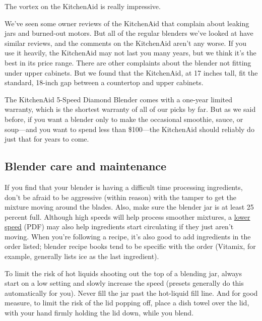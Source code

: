The vortex on the KitchenAid is really impressive.

We've seen some owner reviews of the KitchenAid that complain about
leaking jars and burned-out motors. But all of the regular blenders
we've looked at have similar reviews, and the comments on the KitchenAid
aren't any worse. If you use it heavily, the KitchenAid may not last you
many years, but we think it's the best in its price range. There are
other complaints about the blender not fitting under upper cabinets. But
we found that the KitchenAid, at 17 inches tall, fit the standard,
18-inch gap between a countertop and upper cabinets.

The KitchenAid 5-Speed Diamond Blender comes with a one-year limited
warranty, which is the shortest warranty of all of our picks by far. But
as we said before, if you want a blender only to make the occasional
smoothie, sauce, or soup---and you want to spend less than \$100---the
KitchenAid should reliably do just that for years to come.

\hypertarget{blender-care-and-maintenance}{%
\subsection{Blender care and
maintenance}\label{blender-care-and-maintenance}}

If you find that your blender is having a difficult time processing
ingredients, don't be afraid to be aggressive (within reason) with the
tamper to get the mixture moving around the blades. Also, make sure the
blender jar is at least 25 percent full. Although high speeds will help
process smoother mixtures, a
\href{http://demandware.edgesuite.net/aamb_prd/on/demandware.static/Sites-oster-Site/Sites-oster-Library/default/v1429181234748/documents/instruction-manuals/BLSTVB-RV0-000_IB\%20Versa\%201400\%20Series\%20Blender.pdf}{lower
speed} (PDF) may also help ingredients start circulating if they just
aren't moving. When you're following a recipe, it's also good to add
ingredients in the order listed; blender recipe books tend to be
specific with the order (Vitamix, for example, generally lists ice as
the last ingredient).

To limit the risk of hot liquids shooting out the top of a blending jar,
always start on a low setting and slowly increase the speed (presets
generally do this automatically for you). Never fill the jar past the
hot-liquid fill line. And for good measure, to limit the risk of the lid
popping off, place a dish towel over the lid, with your hand firmly
holding the lid down, while you blend.

